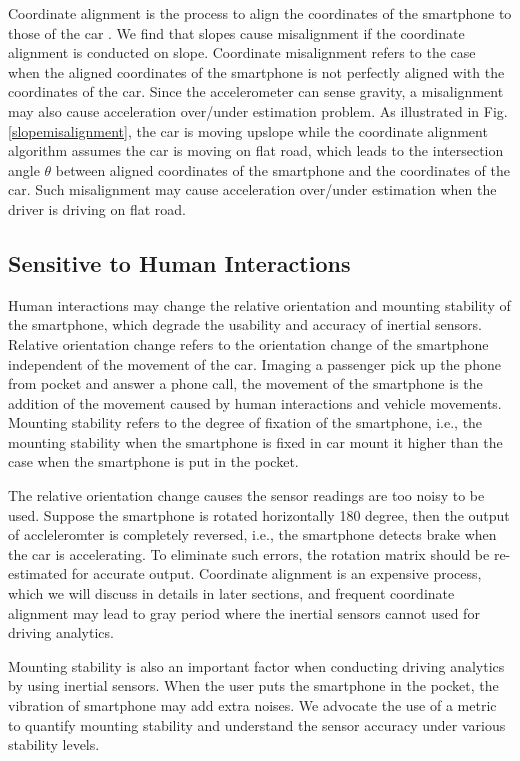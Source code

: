 Coordinate alignment is the process to align the
coordinates of the smartphone to those of the car 
\cite{hansenspeed, wang2013sensing, chen2015invisible}. 
We find that slopes cause misalignment
if the coordinate alignment is conducted on slope. 
Coordinate misalignment refers to the case when the aligned coordinates of 
the smartphone is not perfectly aligned with the coordinates of the car. 
Since the accelerometer can sense gravity, a misalignment
may also cause acceleration over/under estimation problem. 
As illustrated in Fig. \ref{slopemisalignment}, 
the car is moving upslope while the coordinate alignment algorithm
assumes the car is moving on flat road, 
which leads to the intersection angle $\theta$ between
aligned coordinates of the smartphone and the coordinates
of the car. 
Such misalignment may cause acceleration over/under estimation
when the driver is driving on flat road. 


\subsection{Sensitive to Human Interactions}


Human interactions may change the 
relative orientation and mounting stability of the smartphone, 
which degrade the usability and accuracy
of inertial sensors. 
Relative orientation change refers to the
orientation change of the smartphone independent of
the movement of the car. 
Imaging a passenger pick up the phone from pocket
and answer a phone call, 
the movement of the smartphone is the addition of 
the movement caused by human interactions and vehicle movements. 
Mounting stability refers to the degree of fixation of the smartphone, 
i.e., the mounting stability when the smartphone is fixed in car mount
it higher than the case when the smartphone is put in the pocket. 


The relative orientation change causes the sensor
readings are too noisy to be used.
Suppose the smartphone is rotated horizontally 
180 degree, then the output of accleleromter 
is completely reversed, i.e., the smartphone
detects brake when the car is accelerating. 
To eliminate such errors, 
the rotation matrix should be
re-estimated for accurate output. 
Coordinate alignment is an expensive process, 
which we will discuss in details in later sections, 
and frequent coordinate alignment may lead to 
gray period where the inertial sensors
cannot used for driving analytics. 



Mounting stability is also an important factor when 
conducting driving analytics by using inertial sensors. 
When the user puts
the smartphone in the pocket,
the vibration of smartphone may add extra noises.
We advocate the use of a metric to quantify mounting stability
and understand the sensor accuracy under
various stability levels. 



